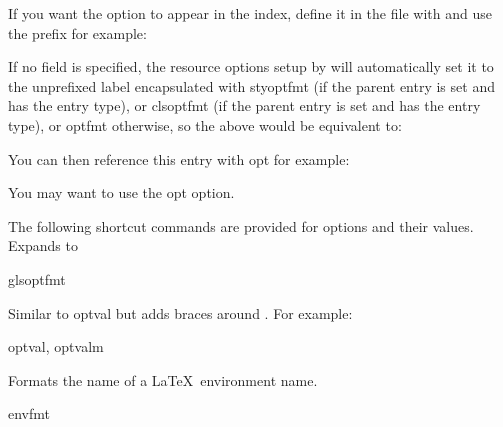 \documentclass[toc=listof]{scrreport}
\begin{document}
If you want the option to appear in the index, define it in
the  file with  and use the prefix
 for example:
\begin{codebox}
\end{codebox}
If no  field is specified, the resource options setup by
 will automatically set it to the unprefixed label
encapsulated with \gls{styoptfmt} (if the parent entry is set and
has the  entry type),
or \gls{clsoptfmt} (if the parent entry is set and
has the  entry type), 
or \gls{optfmt} otherwise, so the above would be equivalent to:
\begin{codebox}
\end{codebox}
You can then reference this entry with \gls{opt} for example:
\begin{codebox}
You may want to use the \gls{opt} option.
\end{codebox}

The following shortcut commands are provided for options and their
values.
Expands to
\begin{compactcodebox}
\gls{gls}\gls{optfmt}
\end{compactcodebox}
Similar to \gls{optval} but adds braces around .
For example:
\begin{codebox}
\gls{optval},
\gls{optvalm}
\end{codebox}

Formats the name of a \LaTeX\ environment name.
\begin{coderesult}
\gls{envfmt}
\tcblower
{}
\end{coderesult}
\end{document}
